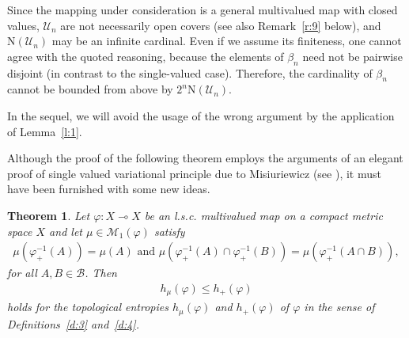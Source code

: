 \documentclass[12pt]{amsart}
\newtheorem{thm}{Theorem}
\theoremstyle{definition}
\newcommand{\U}{\mathcal{U}}
\newcommand{\M}{{\mathcal{M}}}
\newcommand{\NN}{{\mathrm{N}}}
\newcommand{\vp}{\varphi}
\newcommand{\B}{{\mathcal{B}}}
\begin{document}
Since the mapping under consideration is a general multivalued map with closed values, $\U_n$ are not necessarily open covers (see also Remark~\ref{r:9} below), and $\NN(\U_n)$ may be an infinite cardinal. Even if we assume its finiteness, one cannot agree with the quoted reasoning, because the elements of $\beta_n$ need not be pairwise disjoint (in contrast to the single-valued case). Therefore, the cardinality of $\beta_n$ cannot be bounded from above by $2^n\NN(\U_n)$.

In the sequel, we will avoid the usage of the wrong argument by the application of Lemma~\ref{l:1}. 

\bigskip

Although the proof of the following theorem employs the arguments of an elegant proof of single valued variational principle due to Misiuriewicz (see \cite{Mi}), it must have been furnished with some new ideas.

\begin{thm}\label{t:2}
Let $\vp:X\multimap X$ be an l.s.c. multivalued map on a compact metric space $X$ and let $\mu\in\M_1(\vp)$ satisfy
\begin{align}\label{eq:A8}
\mu(\vp_{+}^{-1}(A))=\mu(A) \mbox{ and } \mu(\vp_{+}^{-1}(A)\cap\vp_{+}^{-1}(B)) = \mu(\vp_{+}^{-1}(A\cap B)),
\end{align}
for all $A,B\in\B$. Then
\begin{align}\label{eq:hvp}
h_{\mu}(\vp) \leq h_+(\vp)
\end{align}
holds for the topological entropies $h_\mu(\vp)$ and $h_+(\vp)$ of $\vp$ in the sense of Definitions~\ref{d:3} and~\ref{d:4}.
\end{thm}
\end{document}
